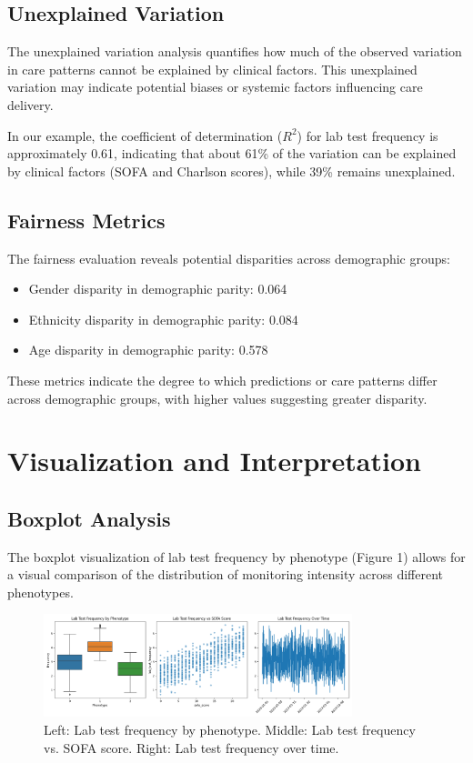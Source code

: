 \documentclass[12pt]{article}
\begin{document}
\subsection{Unexplained Variation}

The unexplained variation analysis quantifies how much of the observed variation in care patterns cannot be explained by clinical factors. This unexplained variation may indicate potential biases or systemic factors influencing care delivery.

In our example, the coefficient of determination ($R^2$) for lab test frequency is approximately 0.61, indicating that about 61\% of the variation can be explained by clinical factors (SOFA and Charlson scores), while 39\% remains unexplained.

\subsection{Fairness Metrics}

The fairness evaluation reveals potential disparities across demographic groups:

\begin{itemize}
    \item Gender disparity in demographic parity: 0.064
    \item Ethnicity disparity in demographic parity: 0.084
    \item Age disparity in demographic parity: 0.578
\end{itemize}

These metrics indicate the degree to which predictions or care patterns differ across demographic groups, with higher values suggesting greater disparity.

\section{Visualization and Interpretation}

\subsection{Boxplot Analysis}

The boxplot visualization of lab test frequency by phenotype (Figure 1) allows for a visual comparison of the distribution of monitoring intensity across different phenotypes.

\begin{figure}[h]
\centering
\includegraphics[width=0.8\textwidth]{../lab_test_analysis.png}
\caption{Left: Lab test frequency by phenotype. Middle: Lab test frequency vs. SOFA score. Right: Lab test frequency over time.}
\end{figure}
\end{document}
